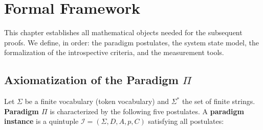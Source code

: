 \section{Formal Framework}

This chapter establishes all mathematical objects needed for the subsequent proofs. We
define, in order: the paradigm postulates, the system state model, the formalization of the
introspective criteria, and the measurement tools.

\subsection{Axiomatization of the Paradigm \texorpdfstring{$\Pi$}{Pi}}

\begin{assumption}\label{asm:paradigm}
Let $\Sigma$ be a finite vocabulary (token vocabulary) and $\Sigma^{*}$ the set of finite
strings. \textbf{Paradigm $\Pi$} is characterized by the following five postulates. A
\textbf{paradigm instance} is a quintuple $\mathcal{I}=(\Sigma, D, A, p, C)$ satisfying all
postulates:


\end{assumption}
